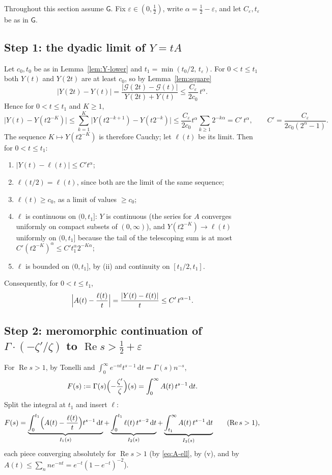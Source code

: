 \documentclass[11pt]{article}
\theoremstyle{definition}
\newcommand{\re}{\operatorname{Re}}
\newcommand{\G}{\mathcal{G}}
\newcommand{\GR}{\mathsf{G}}
\newcommand{\dd}{\,\mathrm{d}}
\begin{document}
Throughout this section assume $\GR$. Fix $\varepsilon\in(0,\tfrac12)$, write $\alpha=\tfrac12-\varepsilon$, and let $C_\varepsilon,t_\varepsilon$ be as in $\GR$.

\subsection*{Step 1: the dyadic limit of $Y=tA$}

Let $c_0,t_0$ be as in Lemma~\ref{lem:Y-lower} and $t_1=\min(t_0/2,\,t_\varepsilon)$.
For $0<t\le t_1$ both $Y(t)$ and $Y(2t)$ are at least $c_0$, so by Lemma~\ref{lem:square}
\[
|Y(2t)-Y(t)|=\frac{|\G(2t)-\G(t)|}{Y(2t)+Y(t)}\le\frac{C_\varepsilon}{2c_0}\,t^{\alpha}.
\]
Hence for $0<t\le t_1$ and $K\ge1$,
\[
\bigl|Y(t)-Y(t2^{-K})\bigr|\le\sum_{k=1}^{K}\bigl|Y(t2^{-k+1})-Y(t2^{-k})\bigr|\le\frac{C_\varepsilon}{2c_0}t^{\alpha}\sum_{k\ge1}2^{-k\alpha}=C'\,t^{\alpha},
\qquad C'=\frac{C_\varepsilon}{2c_0(2^{\alpha}-1)} .
\]
The sequence $K\mapsto Y(t2^{-K})$ is therefore Cauchy; let $\ell(t)$ be its limit. Then for $0<t\le t_1$:
\begin{enumerate}
\item[(i)] $|Y(t)-\ell(t)|\le C't^{\alpha}$;
\item[(ii)] $\ell(t/2)=\ell(t)$, since both are the limit of the same sequence;
\item[(iii)] $\ell(t)\ge c_0$, as a limit of values $\ge c_0$;
\item[(iv)] $\ell$ is continuous on $(0,t_1]$: $Y$ is continuous (the series for $A$ converges uniformly on compact subsets of $(0,\infty)$), and $Y(t2^{-K})\to\ell(t)$ uniformly on $(0,t_1]$ because the tail of the telescoping sum is at most $C'(t2^{-K})^{\alpha}\le C't_1^{\alpha}2^{-K\alpha}$;
\item[(v)] $\ell$ is bounded on $(0,t_1]$, by (ii) and continuity on $[t_1/2,t_1]$.
\end{enumerate}
Consequently, for $0<t\le t_1$,
\begin{equation}\label{eq:A-ell}
\Bigl|A(t)-\frac{\ell(t)}{t}\Bigr|=\frac{|Y(t)-\ell(t)|}{t}\le C'\,t^{\alpha-1}.
\end{equation}

\subsection*{Step 2: meromorphic continuation of $\Gamma\cdot(-\zeta'/\zeta)$ to $\re s>\tfrac12+\varepsilon$}

For $\re s>1$, by Tonelli and $\int_0^\infty e^{-nt}t^{s-1}\dd t=\Gamma(s)n^{-s}$,
\begin{equation}\label{eq:mellin}
F(s):=\Gamma(s)\Bigl(-\frac{\zeta'}{\zeta}\Bigr)(s)=\int_0^\infty A(t)\,t^{s-1}\dd t .
\end{equation}
Split the integral at $t_1$ and insert $\ell$:
\[
F(s)=\underbrace{\int_0^{t_1}\Bigl(A(t)-\frac{\ell(t)}{t}\Bigr)t^{s-1}\dd t}_{I_1(s)}
+\underbrace{\int_0^{t_1}\ell(t)\,t^{s-2}\dd t}_{I_2(s)}
+\underbrace{\int_{t_1}^\infty A(t)\,t^{s-1}\dd t}_{I_3(s)}\qquad(\re s>1),
\]
each piece converging absolutely for $\re s>1$ (by \eqref{eq:A-ell}, by (v), and by $A(t)\le\sum_n ne^{-nt}=e^{-t}(1-e^{-t})^{-2}$).
\end{document}
